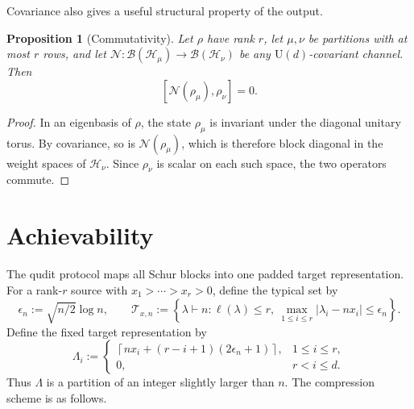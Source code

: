 \documentclass[a4paper,onecolumn,11pt]{quantumarticle}
\newtheorem{prop}{Proposition}
\begin{document}
Covariance also gives a useful structural property of the output.
\begin{prop}[Commutativity]\label{prop:commutativity}
Let $\rho$ have rank $r$, let $\mu,\nu$ be partitions with at most $r$
rows, and let $\mathcal N:\mathcal B(\mathcal H_\mu)\to
\mathcal B(\mathcal H_\nu)$ be any $\mathrm U(d)$-covariant channel.
Then
\[
[\mathcal N(\rho_\mu),\rho_\nu]=0.
\]
\end{prop}
\begin{proof}
In an eigenbasis of $\rho$, the state $\rho_\mu$ is invariant under
the diagonal unitary torus. By covariance, so is
$\mathcal N(\rho_\mu)$, which is therefore block diagonal in the
weight spaces of $\mathcal H_\nu$. Since $\rho_\nu$ is scalar on
each such space, the two operators commute.
\end{proof}

\section{Achievability}\label{sec:direct}

The qudit protocol maps all Schur blocks into one padded target
representation. For a rank-$r$ source with
$x_1>\cdots>x_r>0$, define the typical set by
\begin{equation}\label{eq:typical_set}
    \epsilon_n:=\sqrt{n/2}\log n,
    \qquad
    \mathcal T_{x,n}:=
    \left\{\lambda\vdash n:\ell(\lambda)\le r,\ 
    \max_{1\le i\le r}|\lambda_i-nx_i|\le\epsilon_n\right\}.
\end{equation}
Define the fixed target representation by
\begin{equation}\label{eq:target_rep}
    \Lambda_i:=
    \begin{cases}
        \left\lceil nx_i+(r-i+1)(2\epsilon_n+1)\right\rceil,
        &1\le i\le r,\\
        0,&r<i\le d.
    \end{cases}
\end{equation}
Thus $\Lambda$ is a partition of an integer slightly larger than $n$. The compression scheme is as follows.
\end{document}
